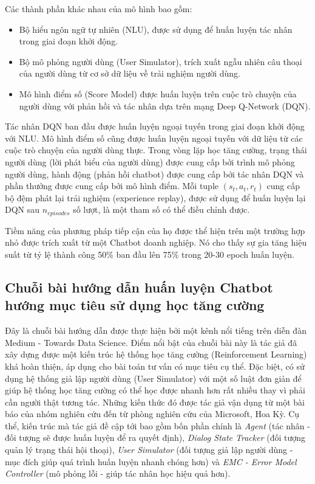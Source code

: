 Các thành phần khác nhau của mô hình bao gồm:
\begin{itemize}
    \item Bộ hiểu ngôn ngữ tự nhiên (NLU), được sử dụng để huấn luyện tác nhân trong giai đoạn khởi động.
    \item Bộ mô phỏng người dùng (User Simulator), trích xuất ngẫu nhiên câu thoại của người dùng từ cơ sở dữ liệu về trải nghiệm người dùng.
    \item Mô hình điểm số (Score Model) được huấn luyện trên cuộc trò chuyện của người dùng với phản hồi và tác nhân dựa trên mạng Deep Q-Network (DQN).
\end{itemize}

Tác nhân DQN ban đầu được huấn luyện ngoại tuyến trong giai đoạn khởi động với NLU. Mô hình điểm số cũng được huấn luyện ngoại tuyến với dữ liệu từ các cuộc trò chuyện của người dùng thực. Trong vòng lặp học tăng cường, trạng thái người dùng (lời phát biểu của người dùng) được cung cấp bởi trình mô phỏng người dùng, hành động (phản hồi chatbot) được cung cấp bởi tác nhân DQN và phần thưởng được cung cấp bởi mô hình điểm. Mỗi tuple $(s_t, a_t, r_t)$ cung cấp bộ đệm phát lại trải nghiệm (experience replay), được sử dụng để huấn luyện lại DQN sau $n_{episodes}$ số lượt, là một tham số có thể điều chỉnh được.

Tiềm năng của phương pháp tiếp cận của họ được thể hiện trên một trường hợp nhỏ được trích xuất từ một Chatbot doanh nghiệp. Nó cho thấy sự gia tăng hiệu suất từ tỷ lệ thành công 50\% ban đầu lên 75\% trong 20-30 epoch huấn luyện.

\subsection{Chuỗi bài hướng dẫn huấn luyện Chatbot hướng mục tiêu sử dụng học tăng cường}
\label{subsec:training}
Đây là chuỗi bài hướng dẫn \cite{traininggochatbot} được thực hiện bởi một kênh nổi tiếng trên diễn đàn Medium - Towards Data Science. Điểm nổi bật của chuỗi bài này là tác giả đã xây dựng được một kiến trúc hệ thống học tăng cường (Reinforcement Learning) khá hoàn thiện, áp dụng cho bài toán tư vấn có mục tiêu cụ thể. Đặc biệt, có sử dụng hệ thống giả lập người dùng (User Simulator) với một số luật đơn giản để giúp hệ thống học tăng cường có thể học được nhanh hơn rất nhiều thay vì phải cần người thật tương tác. Những kiến thức đó được tác giả vận dụng từ một bài báo \cite{endtoend} của nhóm nghiên cứu đến từ phòng nghiên cứu của Microsoft, Hoa Kỳ. Cụ thể, kiến trúc mà tác giả đề cập tới bao gồm bốn phần chính là \textit{Agent} (tác nhân - đối tượng sẽ được huấn luyện để ra quyết định), \textit{Dialog State Tracker} (đối tượng quản lý trạng thái hội thoại), \textit{User Simulator} (đối tượng giả lập người dùng - mục đích giúp quá trình huấn luyện nhanh chóng hơn) và \textit{EMC - Error Model Controller} (mô phỏng lỗi - giúp tác nhân học hiệu quả hơn).

